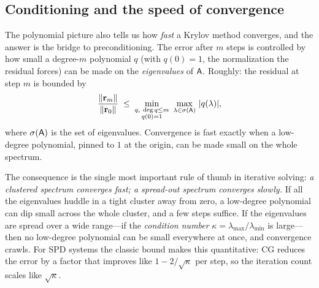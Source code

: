 \subsection{Conditioning and the speed of convergence}
\label{sec:krylov-convergence}

The polynomial picture also tells us how \emph{fast} a Krylov method converges,
and the answer is the bridge to preconditioning. The error after $m$ steps is
controlled by how small a degree-$m$ polynomial $q$ (with $q(0)=1$, the
normalization the residual forces) can be made on the \emph{eigenvalues} of
$\mathsf{A}$. Roughly: the residual at step $m$ is bounded by
\[
  \frac{\norm{\vr_m}}{\norm{\vr_0}}
   \;\le\; \min_{\substack{q,\ \deg q\le m \\ q(0)=1}}\ \max_{\lambda\in\sigma(\mat{A})}\ \abs{q(\lambda)},
\]
where $\sigma(\mathsf{A})$ is the set of eigenvalues. Convergence is fast exactly when
a low-degree polynomial, pinned to $1$ at the origin, can be made small on the
whole spectrum.

The consequence is the single most important rule of thumb in iterative solving:
\emph{a clustered spectrum converges fast; a spread-out spectrum converges slowly.}
If all the eigenvalues huddle in a tight cluster away from zero, a low-degree
polynomial can dip small across the whole cluster, and a few steps suffice. If the
eigenvalues are spread over a wide range---if the \emph{condition number}
$\kappa=\lambda_{\max}/\lambda_{\min}$ is large---then no low-degree polynomial can
be small everywhere at once, and convergence crawls. For SPD systems the classic
bound makes this quantitative: CG reduces the error by a factor that improves like
$1-2/\sqrt{\kappa}$ per step, so the iteration count scales like $\sqrt{\kappa}$.

